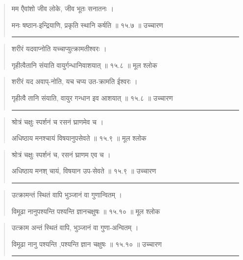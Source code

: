 \begin{quotation}

मम एैवांशो जीव लोके, जीव भूतः सनातनः  ।  

मनः षष्ठान-इन्द्रियाणि, प्रकृति स्थानि कर्षति  ॥ १५.७ ॥  उच्चारण

\noindent\rule{16cm}{0.4pt} 
\end{quotation}


\begin{quotation}

शरीरं यदवाप्नोति यच्चाप्युत्क्रामतीश्वरः  ।  

गृहीत्वैतानि संयाति वायुर्गन्धानिवाशयात्‌  ॥ १५.८ ॥  मूल श्लोक
\end{quotation}

\begin{quotation}

शरीरं यद अवाप्-नोति, यच चप्य उत-क्रामति ईश्वरः  ।  

गृहीत्वै तानि संयाति, वायुर गन्धान इव आशयात्‌  ॥ १५.८ ॥  उच्चारण

\noindent\rule{16cm}{0.4pt} 
\end{quotation}


\begin{quotation}

श्रोत्रं चक्षुः स्पर्शनं च रसनं घ्राणमेव च  ।  

अधिष्ठाय मनश्चायं विषयानुपसेवते ॥ १५.९ ॥  मूल श्लोक
\end{quotation}

\begin{quotation}

श्रोत्रं चक्षुः स्पर्शनं च, रसनं घ्राणम एव च  ।  

अधिष्ठाय मनश् चायं, विषयान उप-सेवते  ॥ १५.९ ॥  उच्चारण

\noindent\rule{16cm}{0.4pt} 
\end{quotation}


\begin{quotation}

उत्क्रामन्तं स्थितं वापि भुञ्जानं वा गुणान्वितम्‌  ।  

विमूढा नानुपश्यन्ति पश्यन्ति ज्ञानचक्षुषः  ॥ १५.१० ॥  मूल श्लोक
\end{quotation}

\begin{quotation}

उत्क्राम अन्तं स्थितं वापि, भुञ्जानं वा गुणा-अन्वितम्‌   ।  

विमूढा नानु पश्यन्ति ,पश्यन्ति ज्ञान चक्षुषः  ॥ १५.१० ॥  उच्चारण

\noindent\rule{16cm}{0.4pt} 
\end{quotation}


